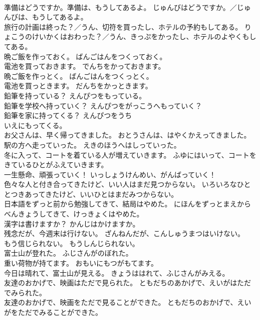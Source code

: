 \documentclass[8pt]{extreport}
\begin{document}
\begin{CJK}{UTF8}{min}
\\	準備はどうですか。準備は、もうしてあるよ。	じゅんびはどうですか。／じゅんびは、もうしてあるよ。 
\\	旅行の計画は終った？／うん、切符を買ったし、ホテルの予約もしてある。	りょこうのけいかくはおわった？／うん、きっぷをかったし、ホテルのよやくもしてある。 
\\	晩ご飯を作っておく。	ばんごはんをつくっておく。 
\\	電池を買っておきます。	でんちをかっておきます。 
\\	晩ご飯を作っとく。	ばんごはんをつくっとく。 
\\	電池を買っときます。	だんちをかっときます。 
\\	鉛筆を持っている？	えんぴつをもっている。 
\\	鉛筆を学校へ持っていく？	えんぴつをがっこうへもっていく？ 
\\	鉛筆を家に持ってくる？	えんぴつを{うち
\\	いえ}にもってくる。 
\\	お父さんは、早く帰ってきました。	おとうさんは、はやくかえってきました。 
\\	駅の方へ走っていった。	えきのほうへはしっていった。 
\\	冬に入って、コートを着ている人が増えていきます。	ふゆにはいって、コートをきているひとがふえていきます。 
\\	一生懸命、頑張っていく！	いっしょうけんめい、がんばっていく！ 
\\	色々な人と付き合ってきたけど、いい人はまだ見つからない。	いろいろなひととつきあってきたけど、いいひとはまだみつからない。 
\\	日本語をずっと前から勉強してきて、結局はやめた。	にほんをずっとまえからべんきょうしてきて、けっきょくはやめた。 
\\	漢字は書けますか？	かんじはかけますか。 
\\	残念だが、今週末は行けない。	ざんねんだが、こんしゅうまつはいけない。 
\\	もう信じられない。	もうしんじられない。 
\\	富士山が登れた。	ふじさんがのぼれた。 
\\	重い荷物が持てます。	おもいにもつがもてます。 
\\	今日は晴れて、富士山が見える。	きょうははれて、ふじさんがみえる。 
\\	友達のおかげで、映画はただで見られた。	ともだちのあかげで、えいがはただでみられた。 
\\	友達のおかげで、映画をただで見ることができた。	ともだちのおかげで、えいがをただでみることができた。 

\end{CJK}
\end{document}
